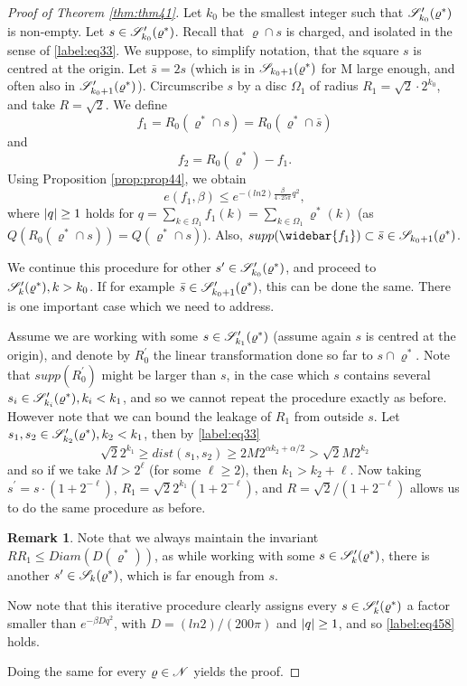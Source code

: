 \documentclass[11pt,reqno]{article}
\DeclarePairedDelimiter\abs{\lvert}{\rvert}%
\theoremstyle{definition}
\newtheorem*{remark}{Remark}
\numberwithin{equation}{section}
\begin{document}
\begin{proof}[Proof of Theorem \eqref{thm:thm41}]
Let $k_0$ be the smallest integer such that $\mathscr{S}^\prime_{k_0}(\varrho^*)$ is non-empty. Let $s\in \mathscr{S}^\prime_{k_0}(\varrho^*)$. Recall that $\varrho \cap s$ is charged, and isolated in the sense of \eqref{label:eq33}. We suppose, to simplify notation, that the square $s$ is centred at the origin. Let $\bar{s} = 2s$ (which is in $\mathscr{S}_{k_0+1}(\varrho^*)$ for M large enough, and often also in $\mathscr{S}^\prime_{k_0+1}(\varrho^*)$).
Circumscribe $s$ by a disc $\Omega_1$ of radius $R_1 = \sqrt{2} \cdot 2^{k_0}$, and take $R = \sqrt{2}$.
We define
$$
f_1 = R_0(\varrho^* \cap s) = R_0(\varrho^* \cap \bar{s})
$$
and
$$
f_2 = R_0(\varrho^*) - f_1.
$$
Using Proposition \eqref{prop:prop44}, we obtain
$$
e(f_1, \beta) \leq e^{-(ln2)\frac{\beta}{4\cdot 25\pi}q^2},
$$
where $\abs{q} \geq 1$ holds for $q = \sum_{k \in \Omega_1} f_1(k) = \sum_{k \in \Omega_1} \varrho^*(k)$ (as $Q(R_0(\varrho^* \cap s)) = Q(\varrho^* \cap s)$). Also, $supp(\widebar{f_1}) \subset \bar{s} \in \SqrsSetOf{k_0+1}{\varrho^*}$.

We continue this procedure for other $s^\prime \in \mathscr{S}^\prime_{k_0}(\varrho^*)$, and proceed to $\mathscr{S}^\prime_{k}(\varrho^*), k > k_0$. If for example $\bar{s} \in \mathscr{S}^\prime_{k_0+1}(\varrho^*)$, this can be done the same. There is one important case which we need to address. 

Assume we are working with some $s \in \mathscr{S}^\prime_{k_1}(\varrho^*)$ (assume again $s$ is centred at the origin), and denote by $R_0^\prime$ the linear transformation done so far to $s \cap \varrho^*$. Note that $supp(R_0^\prime)$ might be larger than $s$, in the case which $s$ contains several $s_i \in \mathscr{S}^\prime_{k_i}(\varrho^*), k_i<k_1$, and so we cannot repeat the procedure exactly as before. However note that we can bound the leakage of $R_1$ from outside $s$. Let $s_1, s_2 \in \mathscr{S}^\prime_{k_2}(\varrho^*), k_2<k_1$, then by \eqref{label:eq33}
$$
\sqrt{2} 2^{k_1} \geq dist(s_1, s_2) \geq 2M2^{\alpha k_2 + \alpha /2} > \sqrt{2} M 2^{k_2}
$$
and so if we take $M > 2^\ell$ (for some $\ell \geq 2$), then $k_1 > k_2 + \ell$. Now taking $s^\prime = s \cdot (1+2^{-\ell})$, $R_1 = \sqrt{2} 2^{k_1} (1+2^{-\ell})$, and $R = \sqrt{2}/(1+2^{-\ell})$ allows us to do the same procedure as before.

\begin{remark}
Note that we always maintain the invariant $RR_1 \leq Diam(D(\varrho^*))$, as while working with some $s \in \mathscr{S}^\prime_{k}(\varrho^*)$, there is another $s^\prime \in \mathscr{S}_{k}(\varrho^*)$, which is far enough from $s$.
\end{remark}

Now note that this iterative procedure clearly assigns every $s \in \mathscr{S}^\prime_{k}(\varrho^*)$ a factor smaller than $e^{-\beta D q^2}$, with $D = (ln2) / (200\pi)$ and $\abs{q} \geq 1$, and so \eqref{label:eq458} holds.

Doing the same for every $\varrho \in \mathscr{N}$ yields the proof.
\end{proof}
\end{document}
